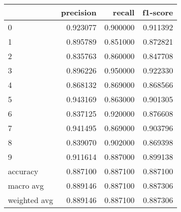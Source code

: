 \begin{tabular}{lrrr}
\toprule
 & precision & recall & f1-score \\
\midrule
0 & 0.923077 & 0.900000 & 0.911392 \\
1 & 0.895789 & 0.851000 & 0.872821 \\
2 & 0.835763 & 0.860000 & 0.847708 \\
3 & 0.896226 & 0.950000 & 0.922330 \\
4 & 0.868132 & 0.869000 & 0.868566 \\
5 & 0.943169 & 0.863000 & 0.901305 \\
6 & 0.837125 & 0.920000 & 0.876608 \\
7 & 0.941495 & 0.869000 & 0.903796 \\
8 & 0.839070 & 0.902000 & 0.869398 \\
9 & 0.911614 & 0.887000 & 0.899138 \\
accuracy & 0.887100 & 0.887100 & 0.887100 \\
macro avg & 0.889146 & 0.887100 & 0.887306 \\
weighted avg & 0.889146 & 0.887100 & 0.887306 \\
\bottomrule
\end{tabular}
